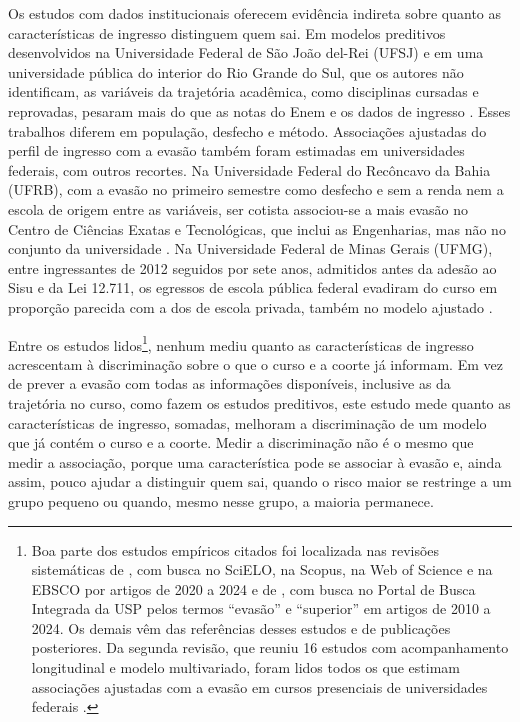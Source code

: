 \documentclass[12pt,a4paper]{article}
\begin{document}
Os estudos com dados institucionais oferecem evidência indireta sobre quanto as características de ingresso distinguem quem sai. Em modelos preditivos desenvolvidos na Universidade Federal de São João del-Rei (UFSJ) e em uma universidade pública do interior do Rio Grande do Sul, que os autores não identificam, as variáveis da trajetória acadêmica, como disciplinas cursadas e reprovadas, pesaram mais do que as notas do Enem e os dados de ingresso \citep{felizardoAnaliseDiscriminanteProbabilidade2023,salaberriMineracaoDadosEducacionais2024}. Esses trabalhos diferem em população, desfecho e método. Associações ajustadas do perfil de ingresso com a evasão também foram estimadas em universidades federais, com outros recortes. Na Universidade Federal do Recôncavo da Bahia (UFRB), com a evasão no primeiro semestre como desfecho e sem a renda nem a escola de origem entre as variáveis, ser cotista associou-se a mais evasão no Centro de Ciências Exatas e Tecnológicas, que inclui as Engenharias, mas não no conjunto da universidade \citep{lopes2023calouros}. Na Universidade Federal de Minas Gerais (UFMG), entre ingressantes de 2012 seguidos por sete anos, admitidos antes da adesão ao Sisu e da Lei 12.711, os egressos de escola pública federal evadiram do curso em proporção parecida com a dos de escola privada, também no modelo ajustado \citep{paula2025evasao}.

Entre os estudos lidos\footnote{Boa parte dos estudos empíricos citados foi localizada nas revisões sistemáticas de \citet{starkEvasaoNoEnsino2025}, com busca no SciELO, na Scopus, na Web of Science e na EBSCO por artigos de 2020 a 2024 e de \citet{mancano2026revisao}, com busca no Portal de Busca Integrada da USP pelos termos ``evasão'' e ``superior'' em artigos de 2010 a 2024. Os demais vêm das referências desses estudos e de publicações posteriores. Da segunda revisão, que reuniu 16 estudos com acompanhamento longitudinal e modelo multivariado, foram lidos todos os que estimam associações ajustadas com a evasão em cursos presenciais de universidades federais \citep{costa2020alem,rosa2021acesso,rosa2022prestigio,nierotkaAcessoEvasaoConclusao2023,nierotkaFatoresAssociadosEvasao2023,lopes2023calouros,klitzkeFATORESASSOCIADOSEVASAO2023,pereira2024evasao}.}, nenhum mediu quanto as características de ingresso acrescentam à discriminação sobre o que o curso e a coorte já informam. Em vez de prever a evasão com todas as informações disponíveis, inclusive as da trajetória no curso, como fazem os estudos preditivos, este estudo mede quanto as características de ingresso, somadas, melhoram a discriminação de um modelo que já contém o curso e a coorte. Medir a discriminação não é o mesmo que medir a associação, porque uma característica pode se associar à evasão e, ainda assim, pouco ajudar a distinguir quem sai, quando o risco maior se restringe a um grupo pequeno ou quando, mesmo nesse grupo, a maioria permanece.
\end{document}

